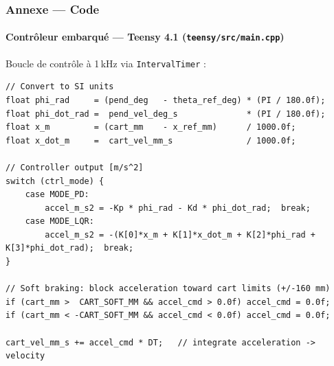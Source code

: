 \begin{frame}[fragile]
\frametitle{Annexe — Code}
\framesubtitle{Contrôleur embarqué — Teensy 4.1 (\texttt{teensy/src/main.cpp})}

Boucle de contrôle à 1\,kHz via \texttt{IntervalTimer} :

\begin{lstlisting}[style=cpp]
// Convert to SI units
float phi_rad     = (pend_deg   - theta_ref_deg) * (PI / 180.0f);
float phi_dot_rad =  pend_vel_deg_s              * (PI / 180.0f);
float x_m         = (cart_mm    - x_ref_mm)      / 1000.0f;
float x_dot_m     =  cart_vel_mm_s               / 1000.0f;

// Controller output [m/s^2]
switch (ctrl_mode) {
    case MODE_PD:
        accel_m_s2 = -Kp * phi_rad - Kd * phi_dot_rad;  break;
    case MODE_LQR:
        accel_m_s2 = -(K[0]*x_m + K[1]*x_dot_m + K[2]*phi_rad + K[3]*phi_dot_rad);  break;
}

// Soft braking: block acceleration toward cart limits (+/-160 mm)
if (cart_mm >  CART_SOFT_MM && accel_cmd > 0.0f) accel_cmd = 0.0f;
if (cart_mm < -CART_SOFT_MM && accel_cmd < 0.0f) accel_cmd = 0.0f;

cart_vel_mm_s += accel_cmd * DT;   // integrate acceleration -> velocity
\end{lstlisting}

\end{frame}

